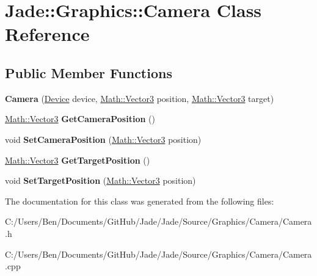 \hypertarget{class_jade_1_1_graphics_1_1_camera}{}\section{Jade\+:\+:Graphics\+:\+:Camera Class Reference}
\label{class_jade_1_1_graphics_1_1_camera}
\subsection*{Public Member Functions}
\begin{DoxyCompactItemize}
\item 
\hypertarget{class_jade_1_1_graphics_1_1_camera_a4283030dc621e2fa9a470de0fce42a2e}{}{\bfseries Camera} (\hyperlink{class_jade_1_1_graphics_1_1_device}{Device} device, \hyperlink{struct_jade_1_1_math_1_1_vector3}{Math\+::\+Vector3} position, \hyperlink{struct_jade_1_1_math_1_1_vector3}{Math\+::\+Vector3} target)\label{class_jade_1_1_graphics_1_1_camera_a4283030dc621e2fa9a470de0fce42a2e}

\item 
\hypertarget{class_jade_1_1_graphics_1_1_camera_af1c98eae9677d60233b5f900e35e8fdd}{}\hyperlink{struct_jade_1_1_math_1_1_vector3}{Math\+::\+Vector3} {\bfseries Get\+Camera\+Position} ()\label{class_jade_1_1_graphics_1_1_camera_af1c98eae9677d60233b5f900e35e8fdd}

\item 
\hypertarget{class_jade_1_1_graphics_1_1_camera_a840768935c9428b0d809235e53a6641a}{}void {\bfseries Set\+Camera\+Position} (\hyperlink{struct_jade_1_1_math_1_1_vector3}{Math\+::\+Vector3} position)\label{class_jade_1_1_graphics_1_1_camera_a840768935c9428b0d809235e53a6641a}

\item 
\hypertarget{class_jade_1_1_graphics_1_1_camera_abee25cd14599c965226ec8f0998d275c}{}\hyperlink{struct_jade_1_1_math_1_1_vector3}{Math\+::\+Vector3} {\bfseries Get\+Target\+Position} ()\label{class_jade_1_1_graphics_1_1_camera_abee25cd14599c965226ec8f0998d275c}

\item 
\hypertarget{class_jade_1_1_graphics_1_1_camera_a75d7041836fec981b01c4f7aaefaa04f}{}void {\bfseries Set\+Target\+Position} (\hyperlink{struct_jade_1_1_math_1_1_vector3}{Math\+::\+Vector3} position)\label{class_jade_1_1_graphics_1_1_camera_a75d7041836fec981b01c4f7aaefaa04f}

\end{DoxyCompactItemize}


The documentation for this class was generated from the following files\+:\begin{DoxyCompactItemize}
\item 
C\+:/\+Users/\+Ben/\+Documents/\+Git\+Hub/\+Jade/\+Jade/\+Source/\+Graphics/\+Camera/Camera.\+h\item 
C\+:/\+Users/\+Ben/\+Documents/\+Git\+Hub/\+Jade/\+Jade/\+Source/\+Graphics/\+Camera/Camera.\+cpp\end{DoxyCompactItemize}
